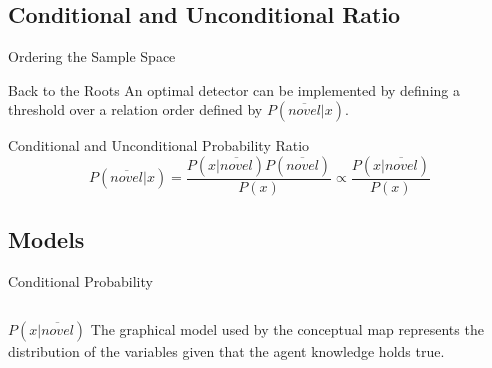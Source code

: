 \documentclass[compress]{beamer}
\begin{document}
\subsection{Conditional and Unconditional Ratio}
\begin{frame}{Ordering the Sample Space}
\begin{block}{Back to the Roots}
An optimal detector can be implemented by defining a threshold over a
relation order defined by $P(\overline{novel}|x)$.
\end{block}
\vfill

\begin{block}{Conditional and Unconditional Probability Ratio}
\[P(\overline{novel}|x) = \frac{P(x|\overline{novel})P(\overline{novel})}{P(x)} \propto \frac{P(x|\overline{novel})}{P(x)}\]
\end{block}
\end{frame}

\subsection{Models}
\begin{frame}{Conditional Probability}
\begin{columns}[c]
    
    \begin{block}{$P(x|\overline{novel})$}
      The graphical model used by the conceptual map represents the distribution of the
      variables given that the agent knowledge holds true.

    \end{block}
\end{columns}
\end{frame}
\end{document}
